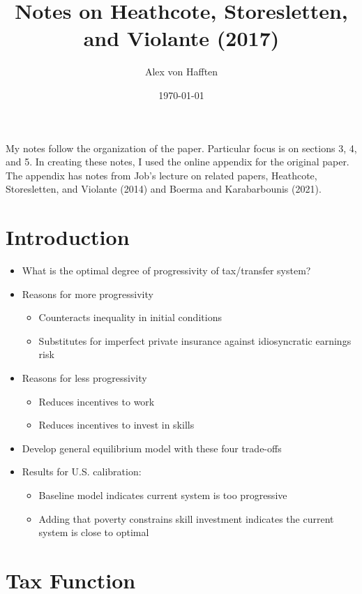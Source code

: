 \documentclass{article}
\title{Notes on Heathcote, Storesletten, and Violante (2017)}
\author{Alex von Hafften}
\date{\today}
\begin{document}
\maketitle

My notes follow the organization of the paper. Particular focus is on sections 3, 4, and 5. In creating these notes, I used the online appendix for the original paper. The appendix has notes from Job's lecture on related papers, Heathcote, Storesletten, and Violante (2014) and Boerma and Karabarbounis (2021).



\section{Introduction}



\begin{itemize}
\item What is the optimal degree of progressivity of tax/transfer system?
\item Reasons for more progressivity
\begin{itemize}
\item Counteracts inequality in initial conditions
\item Substitutes for imperfect private insurance against idiosyncratic earnings risk
\end{itemize}
\item Reasons for less progressivity
\begin{itemize}
\item Reduces incentives to work
\item Reduces incentives to invest in skills
\end{itemize}
\item Develop general equilibrium model with these four trade-offs
\item Results for U.S. calibration:
\begin{itemize}
\item Baseline model indicates current system is too progressive
\item Adding that poverty constrains skill investment indicates the current system is close to optimal
\end{itemize}
\end{itemize}



\section{Tax Function}
\end{document}

